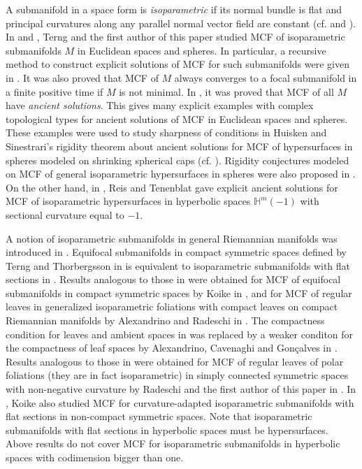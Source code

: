 \documentclass[12pt]{article}
\begin{document}
A submanifold in a space form is {\it isoparametric} if its normal bundle is flat and principal curvatures along any parallel normal vector field are constant (cf. \cite{T.C} and \cite{B.W}).
In \cite{X.CT} and \cite{X.C}, Terng and the first author of this paper studied MCF
of isoparametric submanifolds $M$ in Euclidean spaces and spheres.
In particular, a recursive method to construct explicit solutions of MCF for such submanifolds were given in \cite{X.CT}.
It was also proved that MCF of $M$ always converges to a focal submanifold in a finite positive time if $M$ is not minimal.
In \cite{X.C}, it was proved  that MCF of all $M$ have {\it ancient solutions}. This gives many explicit examples with complex topological types for ancient solutions of MCF in Euclidean spaces and spheres. These examples were used to study sharpness of conditions in  Huisken and Sinestrari's rigidity theorem about ancient solutions for MCF of hypersurfaces in spheres modeled on shrinking
spherical caps (cf. \cite{HS}). Rigidity conjectures modeled on MCF of general isoparametric hypersurfaces in spheres
were also proposed in \cite{X.C}.
On the other hand, in \cite{S.H.T}, Reis and Tenenblat gave explicit ancient solutions for MCF of isoparametric
 hypersurfaces in hyperbolic spaces $\mathbb{H}^{m}(-1)$ with sectional curvature equal to $-1$.

 A notion of isoparametric submanifolds in general Riemannian manifolds was introduced in \cite{HLO}.
Equifocal submanifolds in compact symmetric spaces defined by Terng and Thorbergsson in \cite{TTh}
is equivalent to isoparametric submanifolds with flat sections in \cite{HLO}.
Results analogous to those in \cite{X.CT} were obtained for MCF of equifocal submanifolds in compact symmetric spaces by Koike in \cite{K.N}, and for MCF of regular leaves in generalized isoparametric foliations with compact leaves on compact Riemannian manifolds by Alexandrino and Radeschi in \cite{A.R}. The compactness condition for leaves and ambient spaces in \cite{A.R} was replaced by a weaker conditon for the compactness of leaf spaces by Alexandrino, Cavenaghi and Gon\c{c}alves in \cite{A.C.G}.
Results analogous to those in \cite{X.C} were obtained for MCF of regular leaves of polar foliations (they are in fact isoparametric) in simply connected symmetric spaces with non-negative curvature by Radeschi and the first author of this paper in \cite{L.R}.
In \cite{K.N1}, Koike also studied MCF for curvature-adapted isoparametric submanifolds with flat sections in non-compact
symmetric spaces. Note that isoparametric  submanifolds with flat sections in hyperbolic spaces must be hypersurfaces.
Above results do not cover MCF for isoparametric submanifolds in hyperbolic spaces with codimension bigger than one.
\end{document}
